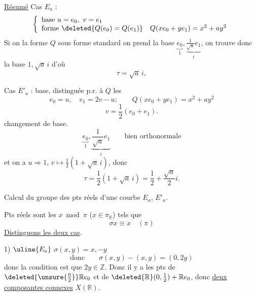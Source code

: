 \uline{Résumé} Cas $E_a$ :
\[
\left\{\begin{array}{l}
\text{base }u=e_0,\ v=e_1\\
\text{forme }\deleted{Q(e_0)=Q(e_1)}\quad Q(xe_0+ye_1)=x^2+ay^2
\end{array}\right.
\]
Si on  la forme $Q$ sous forme standard on
prend la  base
$\underbrace{e_0}_{1},\underbrace{\frac1{\sqrt a}e_1}_{i}$, on trouve donc la base
$1,\sqrt a\,i$ d'où
\[\boxed{\tau=\sqrt a\,i},\]

Cas $E'_a$ : base, 
distinguée p.r. à $Q$ les
\[
e_0=u,\quad e_1=2v-u;\qquad Q(xe_0+ye_1)=x^2+ay^2
\]
\[v=\frac12(e_0+e_1).\]
  changement de base.
\[
\underbrace{e_0}_{1},\underbrace{\frac1{\sqrt a}e_1}_{i}
\qquad\text{bien orthonormale}
\]
et on a $u\Rightarrow1$, $v\mapsto\frac12(1+\sqrt a\,i)$, donc
\[\boxed{\tau=\frac12(1+\sqrt a\,i)}=\frac12+\frac{\sqrt a}{2}i.\]

Calcul du groupe des pts réels d'une courbe $E_a$, $E'_a$.

Pts réels sont les $x\bmod\pi$ ($x\in\pi_{\mathbb R}$) tels que
\[\sigma x\equiv x\quad(\pi)\]
\uline{Distinguons les deux cas}.

1) $\uline{E_a}$  $\sigma(x,y)=x,-y$
\[\text{donc}\qquad\sigma(x,y)-(x,y)=(0,2y)\]
donc la condition est que $2y\in\mathbb Z$. Donc il y a 
les pts de $\deleted{\unsure{\frac02}}\mathbb R e_0$ et de
$\deleted{\mathbb R}(0,\frac12)+\mathbb R e_0$, donc
\uline{deux composantes connexes}  $X(\mathbb R)$.

\margin{$\unsure{<}$}

